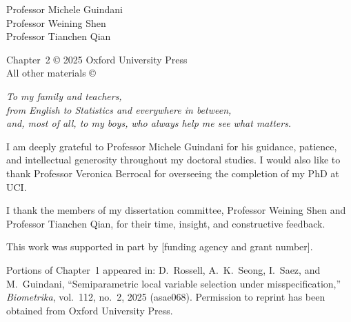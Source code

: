 




\othercommitteemembers
{
  Professor Michele Guindani\\
  Professor Weining Shen\\
  Professor Tianchen Qian
}


\copyrightdeclaration

\prepublishedcopyrightdeclaration
{
	Chapter~2 {\copyright} 2025 Oxford University Press\\
	All other materials {\copyright} {\Degreeyear} \Authorname
}

\dedications
{
  \emph{To my family and teachers,} \\
  \emph{from English to Statistics and everywhere in between,}\\[0.5em]
  \emph{and, most of all, to my boys,} 
  \emph{who always help me see what matters.} \\[0.5em]
}

\acknowledgments
{
  I am deeply grateful to Professor Michele Guindani for his
  guidance, patience, and intellectual generosity throughout my doctoral
  studies.  I would also like to thank Professor Veronica Berrocal for overseeing 
  the completion of my PhD at UCI.

  I thank the members of my dissertation committee,
  Professor Weining Shen and Professor Tianchen Qian,
  for their time, insight, and constructive feedback.

  This work was supported in part by [funding agency and grant number].

  Portions of Chapter~1 appeared in: D.\ Rossell, A.\ K.\ Seong, I.\ Saez,
  and M.\ Guindani, ``Semiparametric local variable selection under
  misspecification,'' \emph{Biometrika}, vol.\ 112, no.\ 2, 2025 (asae068).
  Permission to reprint has been obtained from Oxford University Press.
}



